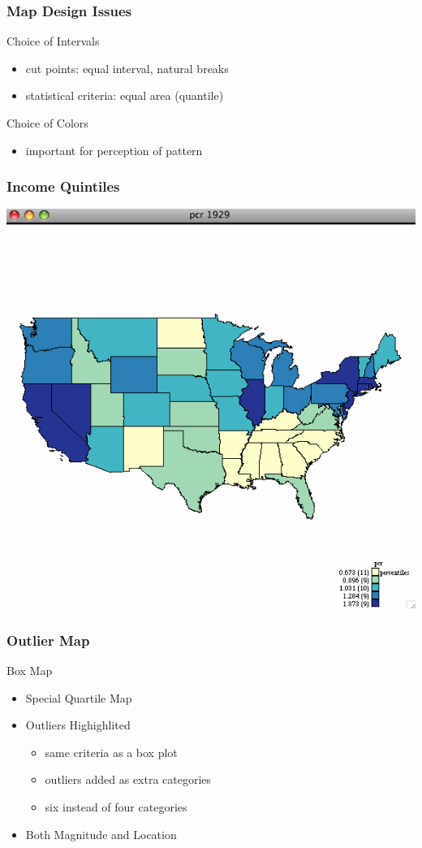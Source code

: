 \documentclass[nototal,handout]{beamer}
\begin{document}
\begin{frame}
	\frametitle{Map Design Issues}
 
\begin{block}{Choice of Intervals}
 \begin{itemize}
 \item  cut points: equal interval, natural breaks
 \item  statistical criteria: equal area (quantile)
 \end{itemize}
 \end{block} 
\begin{block}{Choice of Colors}
 \begin{itemize}
 \item  important for perception of pattern
 \end{itemize}
 \end{block} \end{frame} 

\begin{frame}
	\frametitle{Income Quintiles}
 \begin{center}
 \includegraphics[width=.65\linewidth]{income29.png}
  \end{center}
 \end{frame} 

\begin{frame}
	\frametitle{Outlier Map}
 
\begin{block}{Box Map}
 \begin{itemize}
 \item  Special Quartile Map
 \item  Outliers Highighlited
 \begin{itemize}
 \item  same  criteria as a box plot
 \item  outliers added as extra categories
 \item  six instead of four categories
 \end{itemize}
 \item  Both Magnitude and Location
 \end{itemize}
 \end{block} \end{frame} 
\end{document}
